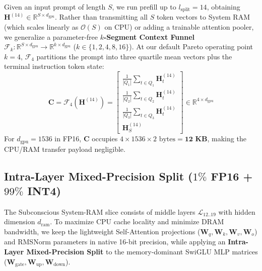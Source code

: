 \documentclass[10pt,twocolumn]{article}
\begin{document}
Given an input prompt of length $S$, we run prefill up to $l_{\text{split}} = 14$, obtaining $\mathbf{H}^{(14)} \in \mathbb{R}^{S \times d_{\text{gpu}}}$. Rather than transmitting all $S$ token vectors to System RAM (which scales linearly as $\mathcal{O}(S)$ on CPU) or adding a trainable attention pooler, we generalize a parameter-free \textbf{$k$-Segment Context Funnel} $\mathcal{F}_k: \mathbb{R}^{S \times d_{\text{gpu}}} \to \mathbb{R}^{k \times d_{\text{gpu}}}$ ($k \in \{1, 2, 4, 8, 16\}$). At our default Pareto operating point $k = 4$, $\mathcal{F}_4$ partitions the prompt into three quartile mean vectors plus the terminal instruction token state:
\begin{equation}
    \mathbf{C} = \mathcal{F}_4\left(\mathbf{H}^{(14)}\right) = \begin{bmatrix}
    \frac{1}{|Q_1|} \sum_{t \in Q_1} \mathbf{H}_t^{(14)} \\[4pt]
    \frac{1}{|Q_2|} \sum_{t \in Q_2} \mathbf{H}_t^{(14)} \\[4pt]
    \frac{1}{|Q_3|} \sum_{t \in Q_3} \mathbf{H}_t^{(14)} \\[4pt]
    \mathbf{H}_{S}^{(14)}
    \end{bmatrix} \in \mathbb{R}^{4 \times d_{\text{gpu}}}
\end{equation}
For $d_{\text{gpu}} = 1536$ in FP16, $\mathbf{C}$ occupies $4 \times 1536 \times 2\text{ bytes} = \mathbf{12\text{ KB}}$, making the CPU/RAM transfer payload negligible.

\subsection{Intra-Layer Mixed-Precision Split ($1\%$ FP16 + $99\%$ INT4)}
The Subconscious System-RAM slice consists of middle layers $\mathcal{L}_{12..19}$ with hidden dimension $d_{\text{ram}}$. To maximize CPU cache locality and minimize DRAM bandwidth, we keep the lightweight Self-Attention projections ($\mathbf{W}_q, \mathbf{W}_k, \mathbf{W}_v, \mathbf{W}_o$) and RMSNorm parameters in native 16-bit precision, while applying an \textbf{Intra-Layer Mixed-Precision Split} to the memory-dominant SwiGLU MLP matrices ($\mathbf{W}_{\text{gate}}, \mathbf{W}_{\text{up}}, \mathbf{W}_{\text{down}}$).
\end{document}
